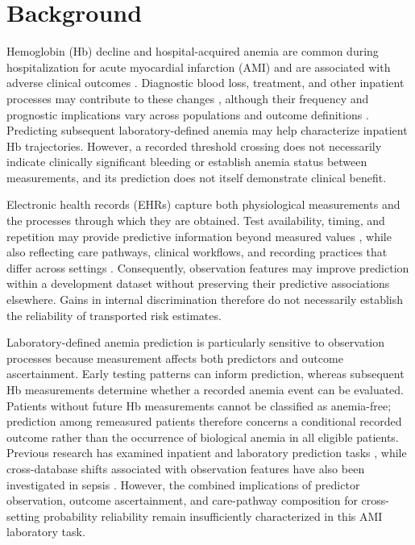 \documentclass[pdflatex,sn-mathphys-num]{sn-jnl}%
\theoremstyle{thmstyleone}%
\theoremstyle{thmstyletwo}%
\theoremstyle{thmstylethree}%
\begin{document}
\maketitle

\section{Background}\label{sec1}

Hemoglobin (Hb) decline and hospital-acquired anemia are common during hospitalization for acute myocardial infarction (AMI) and are associated with adverse clinical outcomes \cite{salisbury2010}. Diagnostic blood loss, treatment, and other inpatient processes may contribute to these changes \cite{salisbury2011}, although their frequency and prognostic implications vary across populations and outcome definitions \cite{li2023,colombo2023}. Predicting subsequent laboratory-defined anemia may help characterize inpatient Hb trajectories. However, a recorded threshold crossing does not necessarily indicate clinically significant bleeding or establish anemia status between measurements, and its prediction does not itself demonstrate clinical benefit.

Electronic health records (EHRs) capture both physiological measurements and the processes through which they are obtained. Test availability, timing, and repetition may provide predictive information beyond measured values \cite{agniel2018,sisk2021,che2018}, while also reflecting care pathways, clinical workflows, and recording practices that differ across settings \cite{finlayson2021,wong2021}. Consequently, observation features may improve prediction within a development dataset without preserving their predictive associations elsewhere. Gains in internal discrimination therefore do not necessarily establish the reliability of transported risk estimates.

Laboratory-defined anemia prediction is particularly sensitive to observation processes because measurement affects both predictors and outcome ascertainment. Early testing patterns can inform prediction, whereas subsequent Hb measurements determine whether a recorded anemia event can be evaluated. Patients without future Hb measurements cannot be classified as anemia-free; prediction among remeasured patients therefore concerns a conditional recorded outcome rather than the occurrence of biological anemia in all eligible patients. Previous research has examined inpatient and laboratory prediction tasks \cite{goodwin2020,lindaLi2022,dauvin2019}, while cross-database shifts associated with observation features have also been investigated in sepsis \cite{yamamoto2026}. However, the combined implications of predictor observation, outcome ascertainment, and care-pathway composition for cross-setting probability reliability remain insufficiently characterized in this AMI laboratory task.
\end{document}

